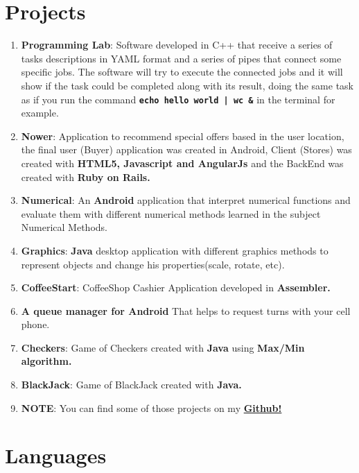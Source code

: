 \documentclass[a4paper,10pt]{article} %
\begin{document}
\section{Projects}
\begin{enumerate}
\item \textbf{Programming Lab}: Software developed in C++ that receive a series of tasks descriptions in YAML format and a series of pipes that connect some specific jobs. The software will try to execute the connected jobs and it will show if the task could be completed along with its result, doing the same task as if you run the command \textbf{\texttt{echo hello world | wc \&}} in the terminal for example.
\item \textbf{Nower}: Application to recommend special offers based in the user location, the final user (Buyer) application was created in Android, Client (Stores) was created with \textbf{HTML5, Javascript and AngularJs} and the BackEnd was created with \textbf{Ruby on Rails.}
\item \textbf{Numerical}: An \textbf{Android} application that interpret numerical functions and evaluate them with different numerical methods learned in the subject Numerical Methods.
\item \textbf{Graphics}: \textbf{Java} desktop application with different graphics methods to represent objects and change his properties(scale, rotate, etc).
\item \textbf{CoffeeStart}: CoffeeShop Cashier Application developed in \textbf{Assembler.}
\item \textbf{A queue manager for Android} That helps to request turns with your cell phone.
\item \textbf{Checkers}:  Game of Checkers created with \textbf{Java} using \textbf{Max/Min algorithm.}
\item \textbf{BlackJack}: Game of BlackJack created with \textbf{Java.}
\item \textbf{NOTE}: You can find some of those projects on my \href{https://github.com/EstebanFS}{\textbf{Github!}}
\end{enumerate}



\section{Languages}
\end{document}
